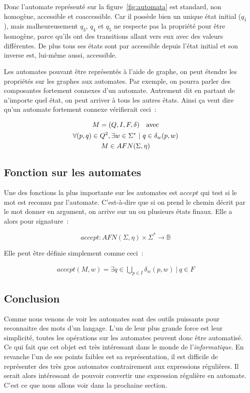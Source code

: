 Donc l'automate représenté sur la figure~\ref{fig:automata} est standard, non
homogène, accessible et coaccessible. Car il possède bien un unique état
initial (\(q_1\)), mais malheureusement \(q_3\), \(q_4\) et \(q_5\) ne respecte
pas la propriété pour être homogène, parce qu'ils ont des transitions allant
vers eux avec des valeurs différentes. De plus tous ses états sont par
accessible depuis l'état initial et son inverse est, lui-même aussi,
accessible.

\vphantom{}

Les automates pouvant être représentés à l'aide de graphe, on peut étendre les
propriétés sur les graphes aux automates. Par exemple, on pourra parler des
composantes fortement connexes d'un automate. Autrement dit en partant de
n'importe quel état, on peut arriver à tous les autres états. Ainsi ça veut
dire qu'un automate fortement connexe vérifierait ceci~:

\begin{gather}
    M = (Q, I, F, \delta) \quad \text{avec} \\
    \forall (p, q) \in Q^2, \exists w \in \Sigma^* ~|~ q \in \delta_w(p, w) \notag \\
    M \in AFN(\Sigma, \eta) \notag
\end{gather}

\subsection{Fonction sur les automates}

Une des fonctions la plus importante sur les automates est \(accept\) qui test
si le mot est reconnu par l'automate. C'est-à-dire que si on prend le chemin
décrit par le mot donner en argument, on arrive sur un ou plusieurs états
finaux. Elle a alors pour signature~:

\[
    accept: AFN(\Sigma, \eta) \times \Sigma^* \to \mathbb{B}
\]

Elle peut être définie simplement comme ceci~:

\begin{align}
    accept(M, w) = \exists q \in \bigcup_{p \in I} \delta_w(p, w) ~|~ q \in F
\end{align}

\subsection{Conclusion}

Comme nous venons de voir les automates sont des outils puissants pour
reconnaitre des mots d'un langage. L'un de leur plus grande force est leur
simplicité, toutes les opérations sur les automates peuvent donc être
automatisé. Ce qui fait que cet objet est très intéressant dans le monde de
l'\textit{informatique}. En revanche l'un de ses points faibles est sa
représentation, il est difficile de représenter des très gros automates
contrairement aux expressions régulières. Il serait alors intéressant de
pouvoir convertir une expression régulière en automate. C'est ce que nous
allons voir dans la prochaine section.